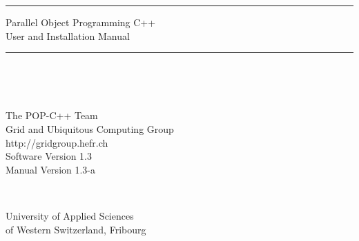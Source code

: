 {
	\color{basic:color}%
	\rule{\linewidth}{5mm}
	\begin{center}
		\textsf{
			\fontsize{30}{30}\sffamily
			Parallel Object Programming C++ \\[5mm]
			\fontsize{32}{32}\sffamily
			User and Installation Manual
		}
	\end{center}
	\rule{\linewidth}{5mm}
}
%
~\\[6mm]
%
\begin{center}
	\epsfysize=80mm%
\end{center}
%
~\\[10mm]
%
\begin{flushright}
	\textsf{{\large The POP-C++ Team\\[1mm]
                        Grid and Ubiquitous Computing Group}\\[1mm]
                        http://gridgroup.hefr.ch\\[12mm]
			Software Version 1.3\\
			Manual Version 1.3-a}\\[6mm]
			
\end{flushright}
%
~\\[4mm]
%
\parbox[t][10mm][t]{18mm}{%
	\epsfysize=15mm%
}
\parbox[t][10mm][t]{120mm}{%
\vspace{-13mm}%
	\textsf{\large 
	University of Applied Sciences \\[1mm]
	of Western Switzerland, Fribourg
	}
}

\pagebreak

